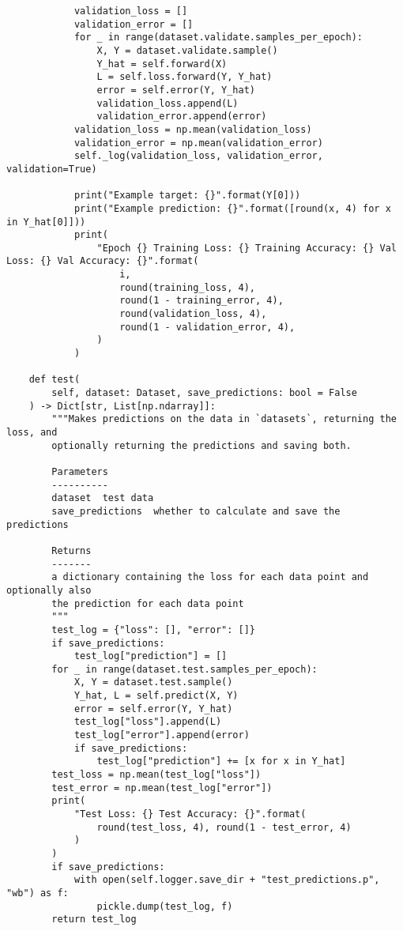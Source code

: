 \documentclass{article}
\begin{document}
\begin{enumerate}
\begin{verbatim}
            validation_loss = []
            validation_error = []
            for _ in range(dataset.validate.samples_per_epoch):
                X, Y = dataset.validate.sample()
                Y_hat = self.forward(X)
                L = self.loss.forward(Y, Y_hat)
                error = self.error(Y, Y_hat)
                validation_loss.append(L)
                validation_error.append(error)
            validation_loss = np.mean(validation_loss)
            validation_error = np.mean(validation_error)
            self._log(validation_loss, validation_error, validation=True)

            print("Example target: {}".format(Y[0]))
            print("Example prediction: {}".format([round(x, 4) for x in Y_hat[0]]))
            print(
                "Epoch {} Training Loss: {} Training Accuracy: {} Val Loss: {} Val Accuracy: {}".format(
                    i,
                    round(training_loss, 4),
                    round(1 - training_error, 4),
                    round(validation_loss, 4),
                    round(1 - validation_error, 4),
                )
            )

    def test(
        self, dataset: Dataset, save_predictions: bool = False
    ) -> Dict[str, List[np.ndarray]]:
        """Makes predictions on the data in `datasets`, returning the loss, and
        optionally returning the predictions and saving both.

        Parameters
        ----------
        dataset  test data
        save_predictions  whether to calculate and save the predictions

        Returns
        -------
        a dictionary containing the loss for each data point and optionally also
        the prediction for each data point
        """
        test_log = {"loss": [], "error": []}
        if save_predictions:
            test_log["prediction"] = []
        for _ in range(dataset.test.samples_per_epoch):
            X, Y = dataset.test.sample()
            Y_hat, L = self.predict(X, Y)
            error = self.error(Y, Y_hat)
            test_log["loss"].append(L)
            test_log["error"].append(error)
            if save_predictions:
                test_log["prediction"] += [x for x in Y_hat]
        test_loss = np.mean(test_log["loss"])
        test_error = np.mean(test_log["error"])
        print(
            "Test Loss: {} Test Accuracy: {}".format(
                round(test_loss, 4), round(1 - test_error, 4)
            )
        )
        if save_predictions:
            with open(self.logger.save_dir + "test_predictions.p", "wb") as f:
                pickle.dump(test_log, f)
        return test_log


\end{verbatim}
\end{enumerate}
\end{document}

